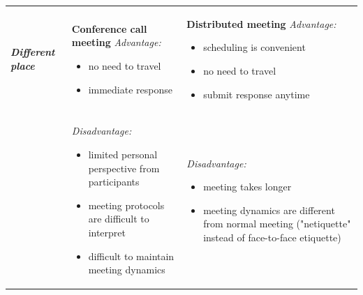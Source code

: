 \begin{table}[!htb]
\begin{center}
\begin{tabular}{ L{2cm} L{6cm}  L{6cm}}
\textbf{\textit{Different place}} & \textbf{Conference call meeting} \qquad \textit{Advantage:} 
\vspace{-3mm}
\begin{itemize}[itemsep=0pt,parsep=0pt]
    \setlength{\itemsep}{0pt}%
    \setlength{\parskip}{0pt}%
	\item{no need to travel}
	\item{immediate response}
\end{itemize} &
\textbf{Distributed meeting} \qquad \textit{Advantage:} 
\vspace{-3mm}
\begin{itemize}[itemsep=0pt,parsep=0pt]
    \setlength{\itemsep}{0pt}%
    \setlength{\parskip}{0pt}%
	\item{scheduling is convenient}
	\item{no need to travel}
	\item{submit response anytime}
\end{itemize} 
\\
& \textit{Disadvantage:} 
\vspace{-3mm}
\begin{itemize}[itemsep=0pt,parsep=0pt]
    \setlength{\itemsep}{0pt}%
    \setlength{\parskip}{0pt}%
	\item{limited personal perspective from participants}
	\item{meeting protocols are difficult to interpret}
	\item{difficult to maintain meeting dynamics}
\end{itemize} &
\textit{Disadvantage:} 
\vspace{-3mm}
\begin{itemize}[itemsep=0pt,parsep=0pt]
    \setlength{\itemsep}{0pt}%
    \setlength{\parskip}{0pt}%
	\item{meeting takes longer}
	\item{meeting dynamics are different from normal meeting ("netiquette" instead of face-to-face etiquette)}
\end{itemize} 
\\ \hline
\end{tabular}
\end{center}
\end{table}


\subsection{} \label{sec:reuse}

